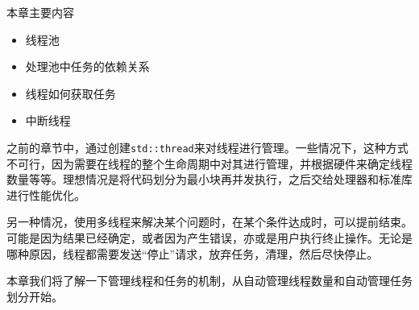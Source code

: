 
本章主要内容

\begin{itemize}
    \item 线程池
    \item 处理池中任务的依赖关系
    \item 线程如何获取任务
    \item 中断线程
\end{itemize}

之前的章节中，通过创建\texttt{std::thread}来对线程进行管理。一些情况下，这种方式不可行，因为需要在线程的整个生命周期中对其进行管理，并根据硬件来确定线程数量等等。理想情况是将代码划分为最小块再并发执行，之后交给处理器和标准库进行性能优化。

另一种情况，使用多线程来解决某个问题时，在某个条件达成时，可以提前结束。可能是因为结果已经确定，或者因为产生错误，亦或是用户执行终止操作。无论是哪种原因，线程都需要发送“停止”请求，放弃任务，清理，然后尽快停止。

本章我们将了解一下管理线程和任务的机制，从自动管理线程数量和自动管理任务划分开始。
